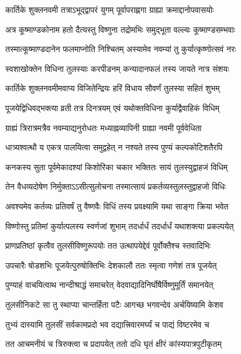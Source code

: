 \twolineshloka
{कार्तिके शुक्लनवमी तत्राऽभूद्द्वापरं युगम्}
{पूर्वापराह्णगा ग्राह्या क्रमाद्दानोपवासयोः} %

\twolineshloka
{अत्र कूष्माण्डकोनाम हतो दैत्यस्तु विष्णुना}
{तद्रोमभिः समुद्भूता वल्ल्यः कूष्माण्डसम्भवाः} %

\twolineshloka
{तस्मात्कूष्माण्डदानेन फलमाप्नोति निश्चितम्}
{अस्यामेव नवम्यां तु कुर्यात्कृष्णोत्सवं नरः} %

\twolineshloka
{स्वशाखोक्तेन विधिना तुलस्याः करपीडनम्}
{कन्यादानफलं तस्य जायते नात्र संशयः} %

\twolineshloka
{कार्तिके शुक्लनवमीमवाप्य विजितेन्द्रियः}
{हरिं विधाय सौवर्णं तुलस्या सहितं शुभम्} %

\twolineshloka
{पूजयेद्विधिवद्भक्त्या व्रती तत्र दिनत्रयम्}
{एवं यथोक्तविधिना कुर्याद्वैवाहिकं विधिम्} %

\twolineshloka
{ग्राह्यं त्रिरात्रमत्रैव नवम्याद्यनुरोधतः}
{मध्याह्नव्यापिनी ग्राह्या नवमी पूर्ववेधिता} %

\twolineshloka
{धात्र्यश्वत्थौ य एकत्र पालयित्वा समुद्वहेत्}
{न नश्यते तस्य पुण्यं कल्पकोटिशतैरपि} %

\twolineshloka
{कनकस्य सुता पूर्वमेकादश्यां किशोरिका}
{चकार भक्तितः सायं तुलस्युद्वाहजं विधिम्} %

\twolineshloka
{तेन वैधव्यदोषेण निर्मुक्ताऽऽसीत्सुलोचना}
{तस्मात्सायं प्रकर्तव्यस्तुलस्तुद्वाहजो विधिः} %

\twolineshloka
{अवश्यमेव कर्तव्यः प्रतिवर्षं तु वैष्णवैः}
{विधिं तस्य प्रवक्ष्यामि यथा साङ्गा क्रिया भवेत} %

\twolineshloka
{विष्णोस्तु प्रतिमां कुर्यात्पलस्य स्वर्णजां शुभाम्}
{तदर्धार्धं तदर्धार्धं यथाशक्त्या प्रकल्पयेत्} %

\twolineshloka
{प्राणप्रतिष्ठां कृत्वैव तुलसीविष्णुरूपयोः}
{तत उत्थापयेद्देवं पूर्वोक्तैश्च स्तवादिभिः} %

\twolineshloka
{उपचारैः षोडशभिः पूजयेत्पुरुषोक्तिभिः}
{देशकालौ ततः स्मृत्वा गणेशं तत्र पूजयेत्} %

\twolineshloka
{पुण्याहं वाचयित्वाथ नान्दीश्राद्धं समाचरेत्}
{वेदवाद्यादिनिर्घोषैर्विष्णुमूर्तिं समानयेत्} %

\twolineshloka
{तुलसीनिकटे सा तु स्थाप्या चान्तर्हिता पटैः}
{आगच्छ भगवन्देव अर्चयिष्यामि केशव} %

\twolineshloka
{तुभ्यं दास्यामि तुलसीं सर्वकामप्रदो भव}
{दद्यात्त्रिवारमर्घ्यं च पाद्यं विष्टरमेव च} %

\twolineshloka
{तत आचमनीयं च त्रिरुक्त्वा च प्रदापयेत्}
{ततो दधि घृतं क्षीरं कांस्यपात्रपुटीकृतम्} %

